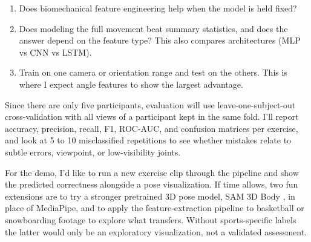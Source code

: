 \begin{enumerate}
\item {} Does biomechanical feature engineering help when the model is held fixed?
\item {} Does modeling the full movement beat summary statistics, and does the answer depend on the feature type? This also compares architectures (MLP vs CNN vs LSTM).
\item {} Train on one camera or orientation range and test on the others. This is where I expect angle features to show the largest advantage.
\end{enumerate}

Since there are only five participants, evaluation will use leave-one-subject-out cross-validation with all views of a participant kept in the same fold. I'll report accuracy, precision, recall, F1, ROC-AUC, and confusion matrices per exercise, and look at 5 to 10 misclassified repetitions to see whether mistakes relate to subtle errors, viewpoint, or low-visibility joints.

For the demo, I'd like to run a new exercise clip through the pipeline and show the predicted correctness alongside a pose visualization. If time allows, two fun extensions are to try a stronger pretrained 3D pose model, SAM 3D Body \parencite{sam3dbody}, in place of MediaPipe, and to apply the feature-extraction pipeline to basketball or snowboarding footage to explore what transfers. Without sports-specific labels the latter would only be an exploratory visualization, not a validated assessment.

\printbibliography


